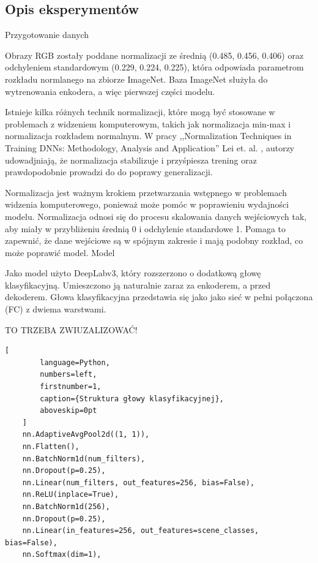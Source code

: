 \subsection{Opis eksperymentów}
\noindent
Przygotowanie danych

Obrazy RGB zostały poddane normalizacji ze średnią (0.485, 0.456, 0.406) oraz odchyleniem standardowym (0.229, 0.224, 0.225), która odpowiada parametrom rozkładu normlanego na zbiorze ImageNet. Baza ImageNet służyła do wytrenowania enkodera, a więc pierwszej części modelu.

Istnieje kilka różnych technik normalizacji, które mogą być stosowane w problemach z widzeniem komputerowym, takich jak normalizacja min-max i normalizacja rozkładem normalnym.  W pracy ,,Normalization Techniques in Training DNNs:
Methodology, Analysis and Application'' Lei et. al. \cite{huang2020normalization}, autorzy udowadjniają, że normalizacja stabilizuje i przyśpiesza trening oraz prawdopodobnie prowadzi do
do poprawy generalizacji. 

Normalizacja jest ważnym krokiem przetwarzania wstępnego w problemach widzenia komputerowego, ponieważ może pomóc w poprawieniu wydajności modelu. Normalizacja odnosi się do procesu skalowania danych wejściowych tak, aby miały w przybliżeniu średnią 0 i odchylenie standardowe 1. Pomaga to zapewnić, że dane wejściowe są w spójnym zakresie i mają podobny rozkład, co może poprawić model.
\noindent
Model

Jako  model użyto DeepLabv3, który rozszerzono o dodatkową głowę klasyfikacyjną. Umieszczono ją naturalnie zaraz za enkoderem, a przed dekoderem. Głowa klasyfikacyjna przedstawia się jako jako sieć w pełni połączona (FC) z dwiema warstwami.  

TO TRZEBA ZWIUZALIZOWAĆ!
\begin{addmargin}[6mm]{0mm}
    \begin{lstlisting}[
        language=Python,
        numbers=left,
        firstnumber=1,
        caption={Struktura głowy klasyfikacyjnej},
        aboveskip=0pt
    ]
    nn.AdaptiveAvgPool2d((1, 1)),
    nn.Flatten(),
    nn.BatchNorm1d(num_filters),
    nn.Dropout(p=0.25),
    nn.Linear(num_filters, out_features=256, bias=False),
    nn.ReLU(inplace=True),
    nn.BatchNorm1d(256),
    nn.Dropout(p=0.25),
    nn.Linear(in_features=256, out_features=scene_classes, bias=False),
    nn.Softmax(dim=1),
    \end{lstlisting}
    \end{addmargin}

